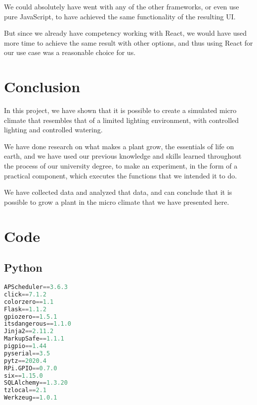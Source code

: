 \documentclass[a4paper,12pt,twoside,openright,titlepage]{book}
\begin{document}
We could absolutely have went with any of the other frameworks, or even use pure JavaScript, to have achieved the same functionality of the resulting UI.

But since we already have competency working with React, we would have used more time to achieve the same result with other options, and thus using React for our use case was a reasonable choice for us.

\chapter{Conclusion}
In this project, we have shown that it is possible to create a simulated micro climate that resembles that of a limited lighting environment, with controlled lighting and controlled watering.

We have done research on what makes a plant grow, the essentials of life on earth, and we have used our previous knowledge and skills learned throughout the process of our university degree, to make an experiment, in the form of a practical component, which executes the functions that we intended it to do.

We have collected data and analyzed that data, and can conclude that it is possible to grow a plant in the micro climate that we have presented here.

\appendix
\cleardoublepage{}
\chapter{Code}

\section{Python}
\begin{lstlisting}[title={raspberrypi/api/requirements.py}, language=Python]
APScheduler==3.6.3
click==7.1.2
colorzero==1.1
Flask==1.1.2
gpiozero==1.5.1
itsdangerous==1.1.0
Jinja2==2.11.2
MarkupSafe==1.1.1
pigpio==1.44
pyserial==3.5
pytz==2020.4
RPi.GPIO==0.7.0
six==1.15.0
SQLAlchemy==1.3.20
tzlocal==2.1
Werkzeug==1.0.1
\end{lstlisting}
\end{document}
